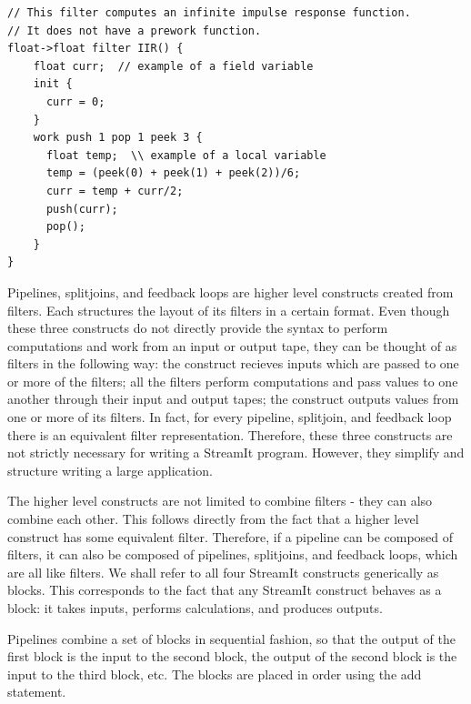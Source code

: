 \begin{scriptsize}
\begin{singlespace}
\begin{verbatim}
// This filter computes an infinite impulse response function.
// It does not have a prework function.
float->float filter IIR() {
    float curr;  // example of a field variable
    init {
      curr = 0;
    }
    work push 1 pop 1 peek 3 {
      float temp;  \\ example of a local variable
      temp = (peek(0) + peek(1) + peek(2))/6;
      curr = temp + curr/2;
      push(curr);
      pop();
    }
}
\end{verbatim}
\end{singlespace}
\end{scriptsize}

    Pipelines, splitjoins, and feedback loops are higher level
constructs created from filters. Each structures the layout of its
filters in a certain format. Even though these three constructs do
not directly provide the syntax to perform computations and work
from an input or output tape, they can be thought of as filters in
the following way: the construct recieves inputs which are passed
to one or more of the filters; all the filters perform
computations and pass values to one another through their input
and output tapes; the construct outputs values from one or more of
its filters. In fact, for every pipeline, splitjoin, and feedback
loop there is an equivalent filter representation. Therefore,
these three constructs are not strictly necessary for writing a
StreamIt program. However, they simplify and structure writing a
large application.

    The higher level constructs are not limited to combine filters -
they can also combine each other. This follows directly from the
fact that a higher level construct has some equivalent filter.
Therefore, if a pipeline can be composed of filters, it can also
be composed of pipelines, splitjoins, and feedback loops, which
are all like filters. We shall refer to all four StreamIt
constructs generically as blocks. This corresponds to the fact
that any StreamIt construct behaves as a block: it takes inputs,
performs calculations, and produces outputs.

    Pipelines combine a set of blocks in sequential fashion, so that
the output of the first block is the input to the second block,
the output of the second block is the input to the third block,
etc. The blocks are placed in order using the add statement.

